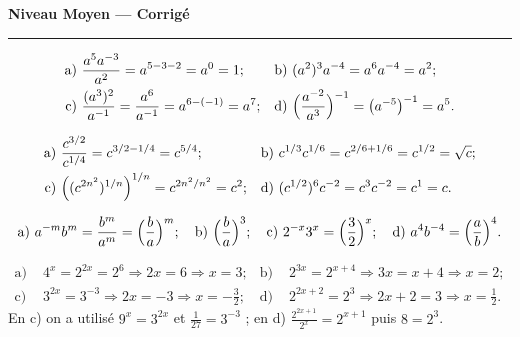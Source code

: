 \documentclass[11pt,a4paper]{article}
\begin{document}
\begin{center}
{\LARGE\bfseries\color{primarydark} Niveau Moyen — Corrigé}\\[2pt]
{\color{primary}\rule{0.45\textwidth}{1.2pt}}
\end{center}
\vspace{1mm}

\begin{corrige}
\begin{align*}
\text{a) }&\frac{a^{5}a^{-3}}{a^{2}}=a^{5-3-2}=a^{0}=1; &
\text{b) }&(a^{2})^{3}a^{-4}=a^{6}a^{-4}=a^{2};\\
\text{c) }&\frac{(a^{3})^{2}}{a^{-1}}=\frac{a^{6}}{a^{-1}}=a^{6-(-1)}=a^{7}; &
\text{d) }&\Bigl(\frac{a^{-2}}{a^{3}}\Bigr)^{-1}=\bigl(a^{-5}\bigr)^{-1}=a^{5}.
\end{align*}
\end{corrige}

\begin{corrige}
\begin{align*}
\text{a) }&\frac{c^{3/2}}{c^{1/4}}=c^{3/2-1/4}=c^{5/4}; &
\text{b) }&c^{1/3}c^{1/6}=c^{2/6+1/6}=c^{1/2}=\sqrt{c};\\
\text{c) }&\Bigl((c^{2n^{2}})^{1/n}\Bigr)^{1/n}=c^{2n^{2}/n^{2}}=c^{2}; &
\text{d) }&(c^{1/2})^{6}c^{-2}=c^{3}c^{-2}=c^{1}=c.
\end{align*}
\end{corrige}

\begin{corrige}
\[ \text{a) } a^{-m}b^{m}=\frac{b^{m}}{a^{m}}=\Bigl(\frac{b}{a}\Bigr)^{m};\quad
   \text{b) } \Bigl(\frac{b}{a}\Bigr)^{3};\quad
   \text{c) } 2^{-x}3^{x}=\Bigl(\frac{3}{2}\Bigr)^{x};\quad
   \text{d) } a^{4}b^{-4}=\Bigl(\frac{a}{b}\Bigr)^{4}. \]
\end{corrige}

\begin{corrige}
\begin{align*}
\text{a) }&4^{x}=2^{2x}=2^{6}\Rightarrow 2x=6\Rightarrow x=3; &
\text{b) }&2^{3x}=2^{x+4}\Rightarrow 3x=x+4\Rightarrow x=2;\\
\text{c) }&3^{2x}=3^{-3}\Rightarrow 2x=-3\Rightarrow x=-\tfrac32; &
\text{d) }&2^{2x+2}=2^{3}\Rightarrow 2x+2=3\Rightarrow x=\tfrac12.
\end{align*}
En c) on a utilisé $9^{x}=3^{2x}$ et $\tfrac{1}{27}=3^{-3}$ ; en d) $\tfrac{2^{2x+1}}{2^{x}}=2^{x+1}$ puis $8=2^{3}$.
\end{corrige}
\end{document}
